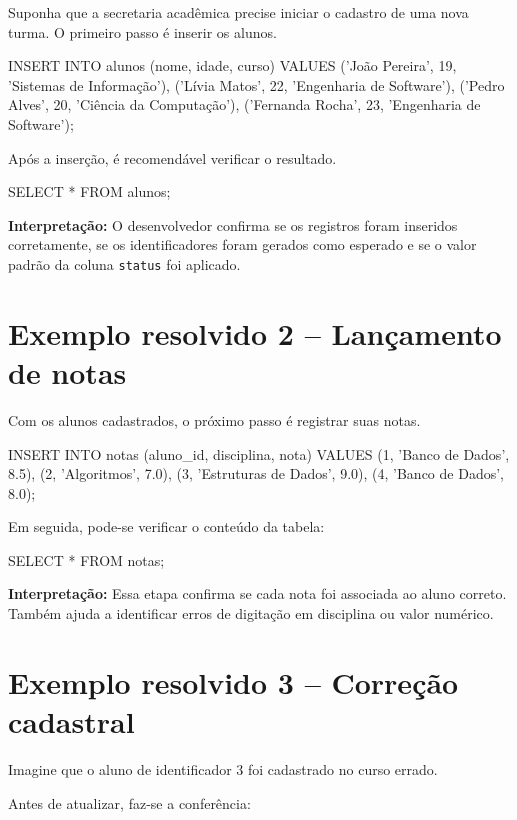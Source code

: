 Suponha que a secretaria acadêmica precise iniciar o cadastro de uma nova turma. O primeiro passo é inserir os alunos.

\begin{sqlcode}
INSERT INTO alunos (nome, idade, curso) VALUES
('João Pereira', 19, 'Sistemas de Informação'),
('Lívia Matos', 22, 'Engenharia de Software'),
('Pedro Alves', 20, 'Ciência da Computação'),
('Fernanda Rocha', 23, 'Engenharia de Software');
\end{sqlcode}

Após a inserção, é recomendável verificar o resultado.

\begin{sqlcode}
SELECT *
FROM alunos;
\end{sqlcode}

\textbf{Interpretação:}  
O desenvolvedor confirma se os registros foram inseridos corretamente, se os identificadores foram gerados como esperado e se o valor padrão da coluna \texttt{status} foi aplicado.

\section{Exemplo resolvido 2 -- Lançamento de notas}

Com os alunos cadastrados, o próximo passo é registrar suas notas.

\begin{sqlcode}
INSERT INTO notas (aluno_id, disciplina, nota) VALUES
(1, 'Banco de Dados', 8.5),
(2, 'Algoritmos', 7.0),
(3, 'Estruturas de Dados', 9.0),
(4, 'Banco de Dados', 8.0);
\end{sqlcode}

Em seguida, pode-se verificar o conteúdo da tabela:

\begin{sqlcode}
SELECT *
FROM notas;
\end{sqlcode}

\textbf{Interpretação:}  
Essa etapa confirma se cada nota foi associada ao aluno correto. Também ajuda a identificar erros de digitação em disciplina ou valor numérico.

\section{Exemplo resolvido 3 -- Correção cadastral}

Imagine que o aluno de identificador 3 foi cadastrado no curso errado.

Antes de atualizar, faz-se a conferência:

